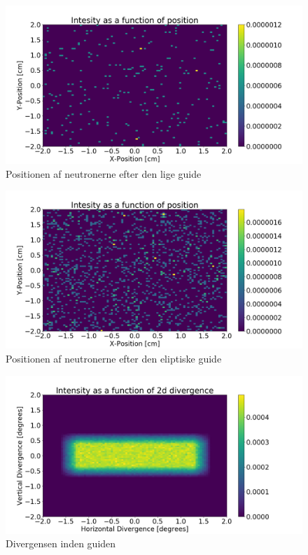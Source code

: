 \documentclass[12pt,oneside,a4paper]{article}
\begin{document}
{{{{{\begin{figure}[H]
\centering
\includegraphics[width=1\textwidth]{psd_straight_after.png}
\caption{Positionen af neutronerne efter den lige guide}
\end{figure}

\begin{figure}[H]
\centering
\includegraphics[width=1\textwidth]{psd_ellipse_after.png}
\caption{Positionen af neutronerne efter den eliptiske guide}
\end{figure}



\begin{figure}[H]
\centering
\includegraphics[width=1\textwidth]{div_straight_before.png}
\caption{Divergensen inden guiden}
\end{figure}

}}}}}
\end{document}

